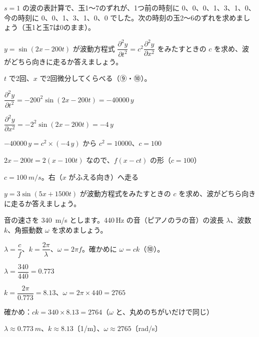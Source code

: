 \begin{jibun}
$s=1$ の波の表計算で、玉1〜7のずれが、1つ前の時刻に 0、0、0、1、3、1、0、今の時刻に 0、0、1、3、1、0、0 でした。次の時刻の玉2〜6のずれを求めましょう（玉1と玉7は0のまま）。
\end{jibun}

\begin{reidai}[形を保って走る波]
$y=\sin(2x-200t)$ が波動方程式 $\dfrac{\partial^2y}{\partial t^2}=c^2\dfrac{\partial^2y}{\partial x^2}$ をみたすときの $c$ を求め、波がどちら向きに走るか答えましょう。\par
\kangaekata $t$ で2回、$x$ で2回微分してくらべる（⑨・⑩）。\par
\shiki $\dfrac{\partial^2y}{\partial t^2}=-200^2\sin(2x-200t)=-40000\,y$\par
\kviiinq $\dfrac{\partial^2y}{\partial x^2}=-2^2\sin(2x-200t)=-4\,y$\par
\kviiinq $-40000\,y=c^2\times(-4\,y)$ から $c^2=10000$、$c=100$\par
\kviiinq $2x-200t=2(x-100t)$ なので、$f(x-ct)$ の形（$c=100$）\par
\kotae $c=\qty{100}{m/s}$。右（$x$ がふえる向き）へ走る
\end{reidai}

\begin{jibun}
$y=3\sin(5x+1500t)$ が波動方程式をみたすときの $c$ を求め、波がどちら向きに走るか答えましょう。
\end{jibun}

\begin{reidai}[波長・波数・角振動数]
音の速さを \qty{340}{m/s} とします。440\,Hz の音（ピアノのラの音）の波長 $\lambda$、波数 $k$、角振動数 $\omega$ を求めましょう。\par
\kangaekata $\lambda=\dfrac{c}{f}$、$k=\dfrac{2\pi}{\lambda}$、$\omega=2\pi f$。確かめに $\omega=ck$（⑩）。\par
\shiki $\lambda=\dfrac{340}{440}=0.773$\par
\kviiinq $k=\dfrac{2\pi}{0.773}=8.13$、$\omega=2\pi\times440=2765$\par
\kviiinq 確かめ：$ck=340\times8.13=2764$（$\omega$ と、丸めのちがいだけで同じ）\par
\kotae $\lambda\approx\qty{0.773}{m}$、$k\approx8.13$〔1/m〕、$\omega\approx2765$〔rad/s〕
\end{reidai}

